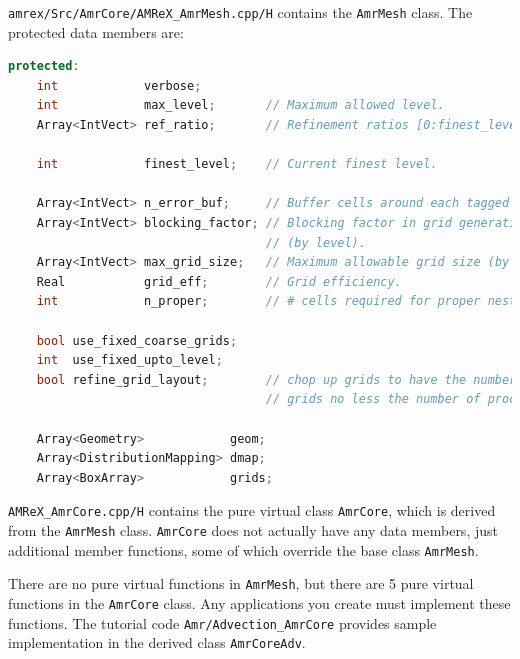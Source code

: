 {\tt amrex/Src/AmrCore/AMReX\_AmrMesh.cpp/H} contains the {\tt AmrMesh} class.
The protected data members are:
\begin{lstlisting}[language=cpp]
protected:
    int            verbose;
    int            max_level;       // Maximum allowed level.
    Array<IntVect> ref_ratio;       // Refinement ratios [0:finest_level-1]

    int            finest_level;    // Current finest level.

    Array<IntVect> n_error_buf;     // Buffer cells around each tagged cell.
    Array<IntVect> blocking_factor; // Blocking factor in grid generation 
                                    // (by level).
    Array<IntVect> max_grid_size;   // Maximum allowable grid size (by level).
    Real           grid_eff;        // Grid efficiency.
    int            n_proper;        // # cells required for proper nesting.

    bool use_fixed_coarse_grids;
    int  use_fixed_upto_level;
    bool refine_grid_layout;        // chop up grids to have the number of 
                                    // grids no less the number of procs

    Array<Geometry>            geom;
    Array<DistributionMapping> dmap;
    Array<BoxArray>            grids;    
\end{lstlisting}

{\tt AMReX\_AmrCore.cpp/H} contains the pure virtual class {\tt AmrCore}, 
which is derived from the {\tt AmrMesh} class.  {\tt AmrCore} does not actually 
have any data members, just additional member functions, some of which override 
the base class {\tt AmrMesh}.

There are no pure virtual functions in {\tt AmrMesh}, but 
there are 5 pure virtual functions in the {\tt AmrCore} class.  Any applications
you create must implement these functions.  The tutorial code 
{\tt Amr/Advection\_AmrCore} provides sample implementation in the derived
class {\tt AmrCoreAdv}.

